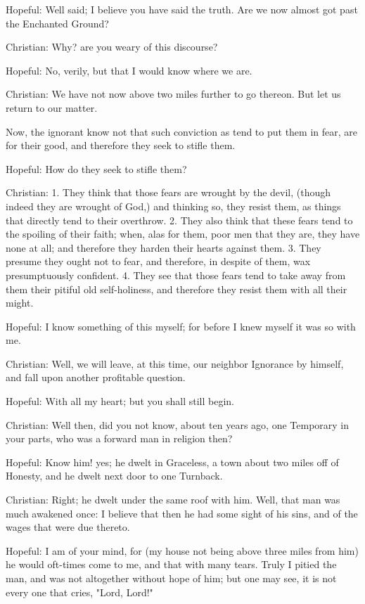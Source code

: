 Hopeful: Well said; I believe you have said the truth. Are we now
almost got past the Enchanted Ground?

Christian: Why? are you weary of this discourse?

Hopeful: No, verily, but that I would know where we are.

Christian: We have not now above two miles further to go thereon. But
let us return to our matter.

Now, the ignorant know not that such conviction as tend to put them in
fear, are for their good, and therefore they seek to stifle them.

Hopeful: How do they seek to stifle them?

Christian: 1. They think that those fears are wrought by the devil,
(though indeed they are wrought of God,) and thinking so, they resist
them, as things that directly tend to their overthrow. 2. They also
think that these fears tend to the spoiling of their faith; when, alas
for them, poor men that they are, they have none at all; and therefore
they harden their hearts against them. 3. They presume they ought not
to fear, and therefore, in despite of them, wax presumptuously
confident. 4. They see that those fears tend to take away from them
their pitiful old self-holiness, and therefore they resist them with
all their might.

Hopeful: I know something of this myself; for before I knew myself it
was so with me.

Christian: Well, we will leave, at this time, our neighbor Ignorance by
himself, and fall upon another profitable question.

Hopeful: With all my heart; but you shall still begin.

Christian: Well then, did you not know, about ten years ago, one
Temporary in your parts, who was a forward man in religion then?

Hopeful: Know him! yes; he dwelt in Graceless, a town about two miles
off of Honesty, and he dwelt next door to one Turnback.

Christian: Right; he dwelt under the same roof with him. Well, that man
was much awakened once: I believe that then he had some sight of his
sins, and of the wages that were due thereto.

Hopeful: I am of your mind, for (my house not being above three miles
from him) he would oft-times come to me, and that with many tears.
Truly I pitied the man, and was not altogether without hope of him; but
one may see, it is not every one that cries, "Lord, Lord!"

